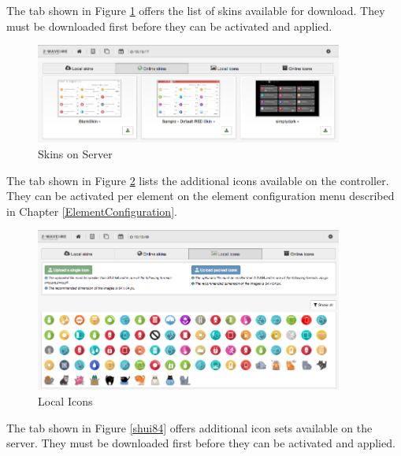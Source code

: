 The tab shown in Figure \ref{shui82} offers the list of skins available for download. 
They must be downloaded first before they can be activated and applied.

\begin{figure}
\begin{center}
\includegraphics[width=0.9\textwidth]{pngs/cap4/shui82.png}
\caption{Skins on Server}
\label{shui82}
\end{center}
\end{figure}

The tab shown in Figure \ref{shui83} lists the additional icons available on the controller. 
They can be activated per element on the element configuration menu described in 
Chapter \ref{ElementConfiguration}.


\begin{figure}
\begin{center}
\includegraphics[width=0.9\textwidth]{pngs/cap4/shui83.png}
\caption{Local Icons}
\label{shui83}
\end{center}
\end{figure}

The tab shown in Figure \ref{shui84} offers additional icon sets available on the server. 
They must be downloaded first before they can be activated and applied.

